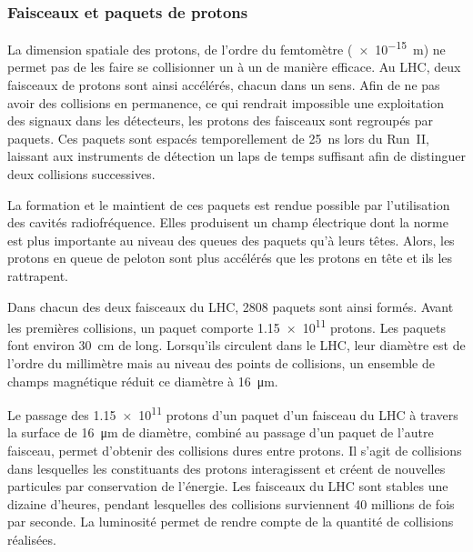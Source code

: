 \subsubsection{Faisceaux et paquets de protons}
La dimension spatiale des protons, de l'ordre du femtomètre (\SI{e-15}{\meter}) ne permet pas de les faire se collisionner un à un de manière efficace.
Au LHC, deux faisceaux de protons sont ainsi accélérés, chacun dans un sens.
Afin de ne pas avoir des collisions en permanence, ce qui rendrait impossible une exploitation des signaux dans les détecteurs, les protons des faisceaux sont regroupés par paquets.
Ces paquets sont espacés temporellement de \SI{25}{\nano\second} lors du Run~II, laissant aux instruments de détection un laps de temps suffisant afin de distinguer deux collisions successives.
\par La formation et le maintient de ces paquets est rendue possible par l'utilisation des cavités radiofréquence.
Elles produisent un champ électrique dont la norme est plus importante au niveau des queues des paquets qu'à leurs têtes.
Alors, les protons \og en queue de peloton \fg{} sont plus accélérés que les protons en tête et ils les rattrapent.
\par Dans chacun des deux faisceaux du LHC, 2808 paquets sont ainsi formés.
Avant les premières collisions, un paquet comporte \num{1.15e11} protons.
Les paquets font environ \SI{30}{\centi\meter} de long.
Lorsqu'ils circulent dans le LHC, leur diamètre est de l'ordre du millimètre mais au niveau des points de collisions, un ensemble de champs magnétique réduit ce diamètre à \SI{16}{\micro\meter}.
\par Le passage des \num{1.15e11} protons d'un paquet d'un faisceau du LHC à travers la surface de \SI{16}{\micro\meter} de diamètre, combiné au passage d'un paquet de l'autre faisceau, permet d'obtenir des collisions dures entre protons.
Il s'agit de collisions dans lesquelles les constituants des protons interagissent et créent de nouvelles particules par conservation de l'énergie.
Les faisceaux du LHC sont stables une dizaine d'heures, pendant lesquelles des collisions surviennent 40 millions de fois par seconde.
La luminosité permet de rendre compte de la quantité de collisions réalisées.
